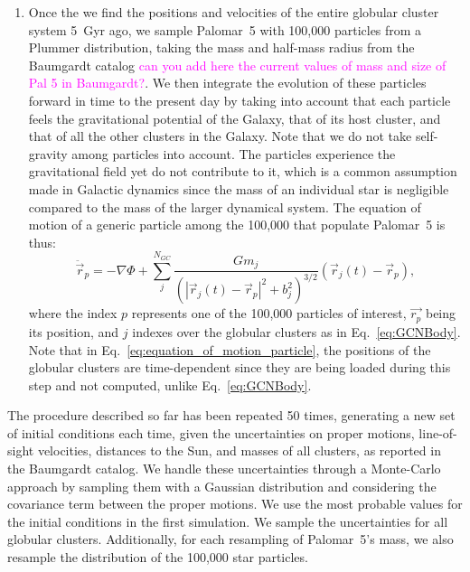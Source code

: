 \documentclass{aa}
\newcommand{\paola}[1]{\textcolor{magenta}{{#1}}}
\begin{document}
\begin{enumerate}
        \item Once the we find the positions and velocities of the entire globular cluster system 5~Gyr ago, we sample Palomar~5 with 100,000 particles from a Plummer distribution, taking the mass and half-mass radius from the Baumgardt catalog \paola{can you add here the current values of mass and size of Pal 5 in Baumgardt?}. We then integrate the evolution of these particles forward in time to the present day by taking into account that each particle feels the gravitational potential of the Galaxy, that of its host cluster, and that of all the other clusters in the Galaxy. Note that we do not take self-gravity among particles into account. The particles experience the gravitational field yet do not contribute to it, which is a common assumption made in Galactic dynamics since the mass of an individual star is negligible compared to the mass of the larger dynamical system. The equation of motion of a generic particle among the 100,000 that populate Palomar~5 is thus: 
        \begin{equation}
          \ddot{\vec{r}}_p = -\nabla \Phi + \left.\sum_{j}^{N_{GC}} \frac{Gm_j}{\left(|\vec{r}_j(t) - \vec{r}_p|^2 + b_j^2\right)^{3/2}}\right. \left(\vec{r}_j(t)- \vec{r}_p\right),
          \end{equation} \label{eq:equation_of_motion_particle} where the index $p$ represents one of the 100,000 particles of interest, $\vec{r_p}$ being its position, and $j$ indexes over the globular clusters as in Eq.~\ref{eq:GCNBody}. Note that in Eq.~\ref{eq:equation_of_motion_particle}, the positions of the globular clusters are time-dependent since they are being loaded during this step and not computed, unlike Eq.~\ref{eq:GCNBody}. 

      \end{enumerate}




        The procedure described so far has been repeated 50 times, generating a new set of initial conditions each time, given the uncertainties on proper motions, line-of-sight velocities, distances to the Sun, and masses of all clusters, as reported in the Baumgardt catalog. We handle these uncertainties through a Monte-Carlo approach by sampling them with a Gaussian distribution and considering the covariance term between the proper motions. We use the most probable values for the initial conditions in the first simulation. We sample the uncertainties for all globular clusters. Additionally, for each resampling of Palomar~5's mass, we also resample the distribution of the 100,000 star particles. 
\end{document}
